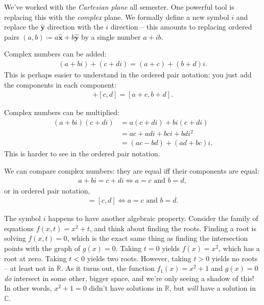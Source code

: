 \begin{remark}

We've worked with the \emph{Cartesian plane} all semester. One powerful
tool is replacing this with the \emph{complex} plane. We formally define
a new symbol \(i\) and replace the \(\widehat{ \mathbf{y} }\) direction
with the \(i\) direction -- this amounts to replacing ordered pairs
\((a, b) \coloneqq a \widehat{ \mathbf{x} } + b\widehat{ \mathbf{y} }\)
by a single number \(a + ib\).

\end{remark}

\begin{example}

Complex numbers can be added:
\begin{align*}
(a + bi) + (c + di) = (a + c) + (b + d)i
.\end{align*}
This is perhaps easier to understand in the ordered pair notation: you
just add the components in each component:
\begin{align*}
[a, b] + [c, d] = [a + c, b + d]
.\end{align*}

Complex numbers can be multiplied:
\begin{align*}
(a +bi)(c+di) 
&= a(c+di) + bi(c+di) \\
&= ac + adi + bci + bdi^2 \\
&= (ac - bd) + (ad + bc)i
.\end{align*}
This is harder to see in the ordered pair notation.

We can compare complex numbers: they are equal iff their components are
equal:
\begin{align*}
a + bi = c+di \iff a=c \text{ and } b = d
,\end{align*}
or in ordered pair notation,
\begin{align*}
[a, b] = [c, d] \iff a = c \text{ and } b = d
.\end{align*}

\end{example}

\begin{remark}

The symbol \(i\) happens to have another algebraic property. Consider
the family of equations \(f(x, t) = x^2 + t\), and think about finding
the roots. Finding a root is solving \(f(x, t) = 0\), which is the exact
same thing as finding the intersection points with the graph of
\(g(x) = 0\). Taking \(t=0\) yields \(f(x) = x^2\), which has a root at
zero. Taking \(t<0\) yields two roots. However, taking \(t>0\) yields no
roots -- at least not in \({\mathbb{R}}\). As it turns out, the function
\(f_1(x) = x^2 + 1\) and \(g(x) = 0\) \emph{do} intersect in some other,
bigger space, and we're only seeing a shadow of this! In other words,
\(x^2+1=0\) didn't have solutions in \({\mathbb{R}}\), but \emph{will}
have a solution in \({\mathbb{C}}\).

\end{remark}

